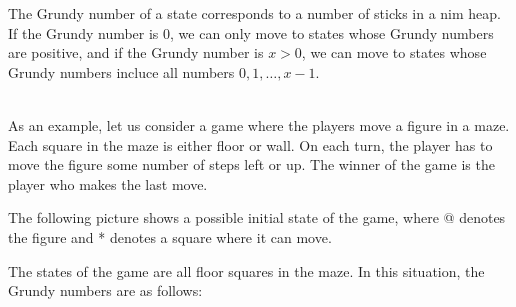 The Grundy number of a state corresponds to
a number of sticks in a nim heap.
If the Grundy number is 0, we can only move to
states whose Grundy numbers are positive,
and if the Grundy number is $x>0$, we can move
to states whose Grundy numbers incluce all numbers
$0,1,\ldots,x-1$.

~\\
\noindent
As an example, let us consider a game where
the players move a figure in a maze.
Each square in the maze is either floor or wall.
On each turn, the player has to move
the figure some number
of steps left or up.
The winner of the game is the player who
makes the last move.

\begin{samepage}
The following picture shows a possible initial state
of the game, where @ denotes the figure and *
denotes a square where it can move.

\begin{center}
\end{center}
\end{samepage}

The states of the game are all floor squares
in the maze.
In this situation, the Grundy numbers
are as follows:

